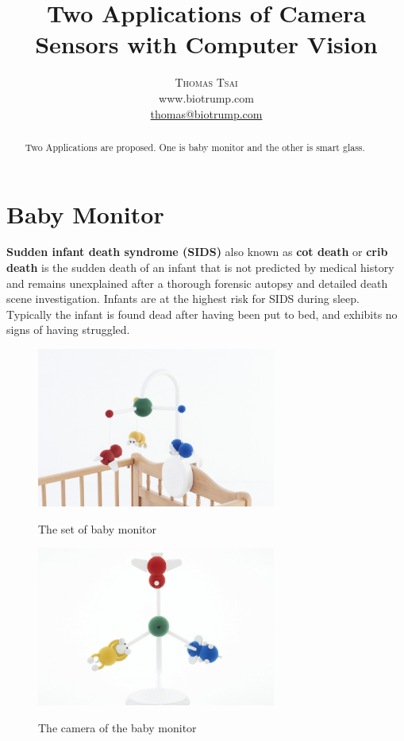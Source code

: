 \documentclass[a4paper,12pt]{article}
\title{\vspace{-15mm}\fontsize{24pt}{10pt}\selectfont\textbf{Two Applications of Camera Sensors with Computer Vision}} %
\author{
\large
\textsc{Thomas Tsai}\\[2mm] %
\normalsize www.biotrump.com \\ %
\normalsize \href{mailto:thomas@biotrump.com}{thomas@biotrump.com} %
\vspace{-5mm}
}
\date{}
\begin{document}
\maketitle

\begin{abstract}
Two Applications are proposed. One is baby monitor and the other is smart glass.

\end{abstract}

\section{Baby Monitor}
\textbf{Sudden infant death syndrome (SIDS)} also known as \textbf{cot death} or \textbf{crib death} is the sudden death of an infant 
that is not predicted by medical history and remains unexplained after a thorough forensic autopsy and 
detailed death scene investigation. 
Infants are at the highest risk for SIDS during sleep. Typically the infant is found dead after having been put to bed, 
and exhibits no signs of having struggled.\cite{wiki-SIDS}\\

\begin{figure}[h]
  \centering
	\includegraphics[width=0.7\textwidth, keepaspectratio=true]{paby-stand}
  \caption{The set of baby monitor }\cite{paby-monitor}
  \label{fig:paby-stand}
\end{figure}

\begin{figure}[h]
  \centering
	\includegraphics[width=0.7\textwidth, keepaspectratio=true]{paby-camera}
  \caption{The camera of the baby monitor}\cite{paby-monitor}
  \label{fig:paby-camera}
\end{figure}
\end{document}
